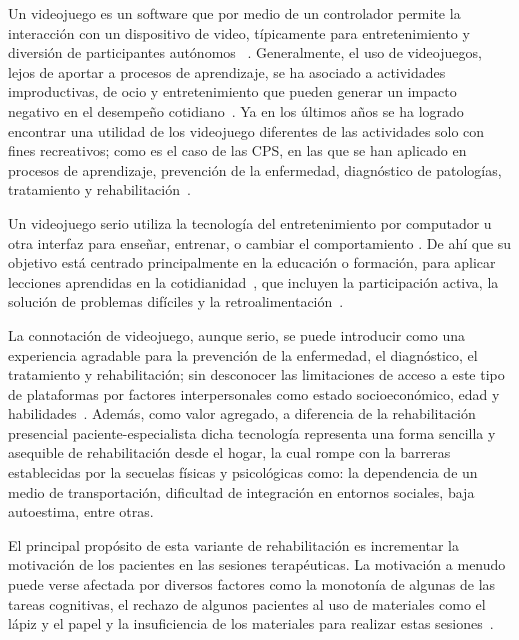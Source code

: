 \begin{introduction}
    \vspace{5pt}
    Un videojuego es un software que por medio de un controlador permite la interacción con un dispositivo de video, típicamente para entretenimiento y diversión de participantes autónomos ~\cite{studenski2010interactive,gomez2012videojuegos, gonzalez2016mooc}. Generalmente, el uso de videojuegos, lejos de aportar a procesos de aprendizaje, se ha asociado a actividades improductivas, de ocio y entretenimiento que pueden generar un impacto negativo en el desempeño cotidiano~\cite{maldonado2014videojuegos}. Ya en los últimos años se ha logrado encontrar una utilidad de los videojuego diferentes de las actividades solo con fines recreativos; como es el caso de las CPS, en las que se han aplicado en procesos de aprendizaje, prevención de la enfermedad, diagnóstico de patologías, tratamiento y rehabilitación~\cite{ladino2021uso}. 

    \vspace{5pt}
    Un videojuego serio utiliza la tecnología del entretenimiento por computador u otra interfaz para enseñar, entrenar, o cambiar el comportamiento . De ahí que su objetivo está centrado principalmente en la educación o formación, para aplicar lecciones aprendidas en la cotidianidad~\cite{graafland2014serious}, que incluyen la participación activa, la solución de problemas difíciles y la retroalimentación~\cite{gee2004learning}.
    
    \vspace{5pt}
    La connotación de videojuego, aunque serio, se puede introducir como una experiencia agradable para la prevención de la enfermedad, el diagnóstico, el tratamiento y rehabilitación; sin desconocer las limitaciones de acceso a este tipo de plataformas por factores interpersonales como estado socioeconómico, edad y habilidades~\cite{ladino2021uso}. Además, como valor agregado, a diferencia de la rehabilitación presencial paciente-especialista dicha tecnología representa una forma sencilla y asequible de rehabilitación desde el hogar, la cual rompe con la barreras establecidas por la secuelas físicas y psicológicas como: la dependencia de un medio de transportación, dificultad de integración en entornos sociales, baja autoestima, entre otras.

    \vspace{5pt}
    El principal propósito de esta variante de rehabilitación es incrementar la motivación de los pacientes en las sesiones terapéuticas. La motivación a menudo puede verse afectada por diversos factores como la monotonía de algunas de las tareas cognitivas, el rechazo de algunos pacientes al uso de materiales como el lápiz y el papel y la insuficiencia de los materiales para realizar estas sesiones~\cite{regalon12019juegos}. 


\end{introduction}
